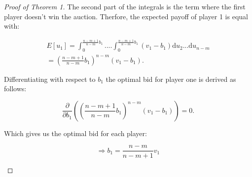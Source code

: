 \begin{proof}[Proof of Theorem 1]
The second part of the integrals is the term where the first player doesn't win the auction. Therfore, the expected payoff of player 1 is equal with:
\begin{small}
\begin{align}
E[u_1] =\int_0^{\frac{n-m+1}{n-m}b_1}  .... \int_0^{\frac{n-m+1}{n-m}b_1} \! (v_1 -b_1)  \mathrm{d}u_2 ... \mathrm{d}u_{n-m} \nonumber \\
= {(\frac{n-m+1}{n-m} b_1) }^{n-m} (v_1 -b_1).  
\end{align}
\end{small}
Differentiating with respect to $b_1$ the optimal bid for player one is derived as follows:
\begin{small}
\begin{equation}
\frac{\partial}{\partial b_1} ( {(\frac{n-m+1}{n-m} b_1) }^{n-m} (v_1 -b_1))=0.
\end{equation}
\end{small}
Which gives us the optimal bid for each player:
\begin{small}
\begin{equation}
\Rightarrow b_1= \frac{n-m}{n-m+1}v_1
\end{equation}
\end{small}
\end{proof}

